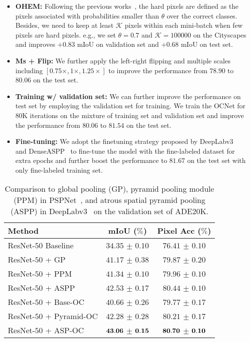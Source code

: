 \documentclass[10pt,twocolumn,letterpaper]{article}
\begin{document}
\begin{itemize}
\item 
{\textbf{OHEM:}
Following the previous works~\cite{wu2016high}, the hard pixels are defined as the pixels associated with probabilities smaller than $\theta$ over the correct classes. Besides, we need to keep at least $\mathcal{K}$ pixels within each mini-batch when few pixels are hard pixels. e.g., we set $\theta=0.7$ and $\mathcal{K}=100000$ on the Cityscapes and improves $+0.83$ mIoU on validation set and $+0.68$ mIoU on test set.}
\item 
{\textbf{Ms + Flip:}
We further apply the left-right flipping and multiple scales including $[0.75\times, 1\times, 1.25\times]$ to improve the performance from $78.90$ to $80.06$ on the test set.}
\item 
{\textbf{Training w/ validation set:}
We can further improve the performance on test set by employing the validation set for training.
We train the OCNet for 80K iterations on the mixture of training set and validation set and improve the performance from $80.06$ to $81.54$ on the test set.
}

\item 
\textbf{Fine-tuning:} 
We adopt the finetuning strategy proposed by DeepLabv3~\cite{chen2017rethinking} and DenseASPP~\cite{Yang_2018_CVPR} to fine-tune the model with the fine-labeled dataset for extra epochs 
and further boost the performance to $81.67$ on the test set with only fine-labeled training set.
\end{itemize}


\begin{table}[htb]
\centering
\footnotesize
\caption{\small{Comparison to global pooling (GP), pyramid pooling module (PPM) in PSPNet~\cite{zhao2017pyramid},
and atrous spatial pyramid pooling (ASPP) in DeepLabv3~\cite{chen2017rethinking} on the validation set of ADE20K.}}
\begin{tabular}{l|c|c} \hline
Method & mIoU ($\%$) & Pixel Acc ($\%$)  \\
\hline  
ResNet-$50$ Baseline  &   $34.35$ $\pm$ $0.10$  &  $76.41$ $\pm$ $0.10$  \\  
\hline
ResNet-$50$ + GP~\cite{liu2015parsenet}  &   $41.17$ $\pm$ $0.38$  &  $79.87$ $\pm$ $0.20$  \\ 
ResNet-$50$ + PPM~\cite{zhao2017pyramid}  &  $41.34$ $\pm$ $0.10$  &  $79.96$ $\pm$ $0.10$  \\ 
ResNet-$50$ + ASPP~\cite{chen2017rethinking} &  $42.53$ $\pm$ $0.17$  &  $80.44$ $\pm$ $0.10$ \\
\hline  
ResNet-$50$ + Base-OC  &  $40.66$ $\pm$ $0.26$ &  $79.77$ $\pm$ $0.17$  \\ 
ResNet-$50$ + Pyramid-OC  &  $42.28$ $\pm$ $0.28$  &  $80.21$ $\pm$ $0.17$ \\ 
ResNet-$50$ + ASP-OC &  $\bf{43.06}$ $\pm$ $\bf{0.15}$ &  $\bf{80.70}$ $\pm$ $\bf{0.10}$  \\ 
\hline
\end{tabular}
\label{table:ocvsppmasppgc_ade}
\end{table}
\end{document}
